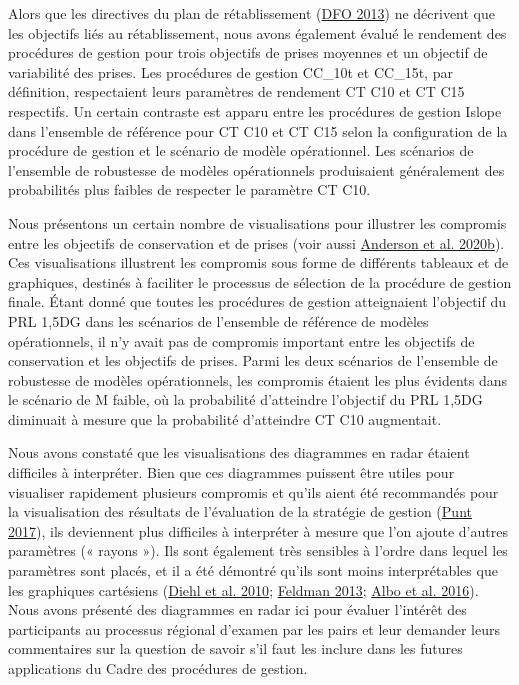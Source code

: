 \documentclass[french,11pt]{book}
\begin{document}
Alors que les directives du plan de rétablissement (\protect\hyperlink{ref-dfo2013}{DFO 2013}) ne décrivent que les objectifs liés au rétablissement, nous avons également évalué le rendement des procédures de gestion pour trois objectifs de prises moyennes et un objectif de variabilité des prises. Les procédures de gestion CC\_10t et CC\_15t, par définition, respectaient leurs paramètres de rendement CT C10 et CT C15 respectifs. Un certain contraste est apparu entre les procédures de gestion Islope dans l'ensemble de référence pour CT C10 et CT C15 selon la configuration de la procédure de gestion et le scénario de modèle opérationnel. Les scénarios de l'ensemble de robustesse de modèles opérationnels produisaient généralement des probabilités plus faibles de respecter le paramètre CT C10.

Nous présentons un certain nombre de visualisations pour illustrer les compromis entre les objectifs de conservation et de prises (voir aussi \protect\hyperlink{ref-anderson2020gfmp}{Anderson et al. 2020b}). Ces visualisations illustrent les compromis sous forme de différents tableaux et de graphiques, destinés à faciliter le processus de sélection de la procédure de gestion finale. Étant donné que toutes les procédures de gestion atteignaient l'objectif du PRL 1,5DG dans les scénarios de l'ensemble de référence de modèles opérationnels, il n'y avait pas de compromis important entre les objectifs de conservation et les objectifs de prises. Parmi les deux scénarios de l'ensemble de robustesse de modèles opérationnels, les compromis étaient les plus évidents dans le scénario de M faible, où la probabilité d'atteindre l'objectif du PRL 1,5DG diminuait à mesure que la probabilité d'atteindre CT C10 augmentait.

Nous avons constaté que les visualisations des diagrammes en radar étaient difficiles à interpréter. Bien que ces diagrammes puissent être utiles pour visualiser rapidement plusieurs compromis et qu'ils aient été recommandés pour la visualisation des résultats de l'évaluation de la stratégie de gestion (\protect\hyperlink{ref-punt2017}{Punt 2017}), ils deviennent plus difficiles à interpréter à mesure que l'on ajoute d'autres paramètres (« rayons »). Ils sont également très sensibles à l'ordre dans lequel les paramètres sont placés, et il a été démontré qu'ils sont moins interprétables que les graphiques cartésiens (\protect\hyperlink{ref-diehl2010}{Diehl et al. 2010}; \protect\hyperlink{ref-feldman2013}{Feldman 2013}; \protect\hyperlink{ref-albo2016}{Albo et al. 2016}). Nous avons présenté des diagrammes en radar ici pour évaluer l'intérêt des participants au processus régional d'examen par les pairs et leur demander leurs commentaires sur la question de savoir s'il faut les inclure dans les futures applications du Cadre des procédures de gestion.
\end{document}
